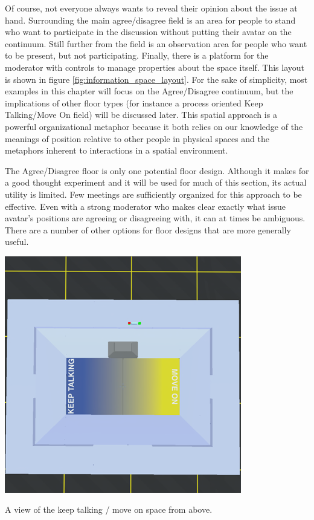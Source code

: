 Of course, not everyone always wants to reveal their opinion about the issue at hand. Surrounding the main agree/disagree field is an area for people to stand who want to participate in the discussion without putting their avatar on the continuum. Still further from the field is an observation area for people who want to be present, but not participating. Finally, there is a platform for the moderator with controls to manage properties about the space itself. This layout is shown in figure \ref{fig:information_space_layout}. For the sake of simplicity, most examples in this chapter will focus on the Agree/Disagree continuum, but the implications of other floor types (for instance a process oriented Keep Talking/Move On field) will be discussed later. This spatial approach is a powerful organizational metaphor because it both relies on our knowledge of the meanings of position relative to other people in physical spaces \citep{Yee:2007cl} and the metaphors inherent to interactions in a spatial environment. \citep{lakoff_metaphors_1980}

The Agree/Disagree floor is only one potential floor design. Although it makes for a good thought experiment and it will be used for much of this section, its actual utility is limited. Few meetings are sufficiently organized for this approach to be effective. Even with a strong moderator who makes clear exactly what issue avatar's positions are agreeing or disagreeing with, it can at times be ambiguous. There are a number of other options for floor designs that are more generally useful.

\begin{marginfigure}
	\includegraphics{figures/keep_talking_from_above.png}
	\caption{A view of the keep talking / move on space from above.}
	\label{fig:keep_talking_floor}
\end{marginfigure}

